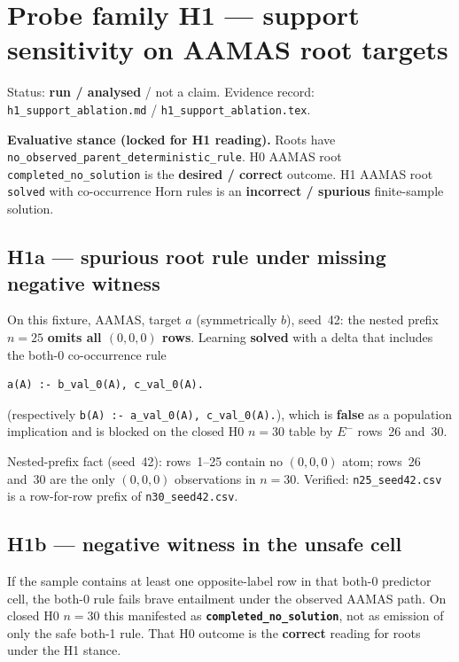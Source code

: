 \documentclass[11pt]{article}
\begin{document}
\section{Probe family H1 --- support sensitivity on AAMAS root targets}

Status: \textbf{run / analysed} / not a claim.
Evidence record: \texttt{h1\_support\_ablation.md} / \texttt{h1\_support\_ablation.tex}.

\textbf{Evaluative stance (locked for H1 reading).}
Roots have \texttt{no\_observed\_parent\_deterministic\_rule}.
H0 AAMAS root \texttt{completed\_no\_solution} is the \textbf{desired / correct}
outcome.
H1 AAMAS root \texttt{solved} with co-occurrence Horn rules is an
\textbf{incorrect / spurious} finite-sample solution.

\subsection{H1a --- spurious root rule under missing negative witness}

On this fixture, AAMAS, target \(a\) (symmetrically \(b\)), seed~42: the nested
prefix \(n{=}25\) \textbf{omits all \((0,0,0)\) rows}.
Learning \textbf{solved} with a delta that includes the both-0 co-occurrence
rule
\begin{verbatim}
a(A) :- b_val_0(A), c_val_0(A).
\end{verbatim}
(respectively \texttt{b(A) :- a\_val\_0(A), c\_val\_0(A).}), which is
\textbf{false} as a population implication and is blocked on the closed H0
\(n{=}30\) table by \(E^-\) rows~26 and~30.

Nested-prefix fact (seed~42): rows~1--25 contain no \((0,0,0)\) atom;
rows~26 and~30 are the only \((0,0,0)\) observations in \(n{=}30\).
Verified: \texttt{n25\_seed42.csv} is a row-for-row prefix of
\texttt{n30\_seed42.csv}.

\subsection{H1b --- negative witness in the unsafe cell}

If the sample contains at least one opposite-label row in that both-0 predictor
cell, the both-0 rule fails brave entailment under the observed AAMAS path. On
closed H0 \(n{=}30\) this manifested as
\textbf{\texttt{completed\_no\_solution}}, not as emission of only the safe
both-1 rule.
That H0 outcome is the \textbf{correct} reading for roots under the H1 stance.
\end{document}
